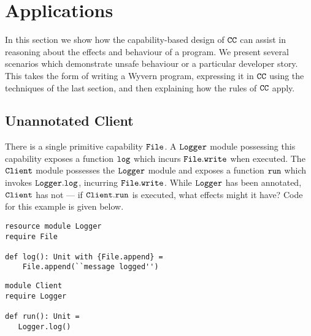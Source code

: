 
\section{Applications}

In this section we show how the capability-based design of $\mathtt{CC}$ can assist in reasoning about the effects and behaviour of a program. We present several scenarios which demonstrate unsafe behaviour or a particular developer story. This takes the form of writing a Wyvern program, expressing it in $\mathtt{CC}$ using the techniques of the last section, and then explaining how the rules of $\mathtt{CC}$ apply. 







































\subsection{Unannotated Client}

There is a single primitive capability $\mathtt{File}$. A $\mathtt{Logger}$ module possessing this capability exposes a function $\mathtt{log}$ which incurs $\mathtt{File.write}$ when executed. The $\mathtt{Client}$ module possesses the $\mathtt{Logger}$ module and exposes a function $\mathtt{run}$ which invokes $\mathtt{Logger.log}$, incurring $\mathtt{File.write}$. While $\mathtt{Logger}$ has been annotated, $\mathtt{Client}$ has not --- if $\mathtt{Client.run}$ is executed, what effects might it have? Code for this example is given below. 

\begin{lstlisting}
resource module Logger
require File

def log(): Unit with {File.append} =
    File.append(``message logged'')
\end{lstlisting}

\begin{lstlisting}
module Client
require Logger

def run(): Unit =
   Logger.log()
\end{lstlisting}

